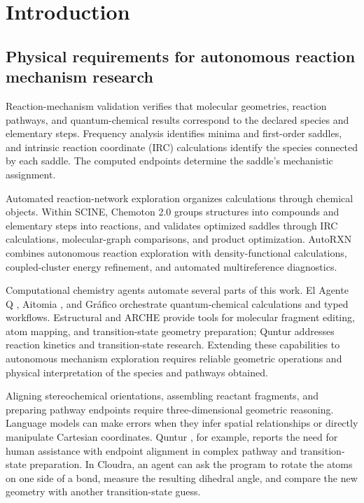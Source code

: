 \section{Introduction}

\subsection{Physical requirements for autonomous reaction mechanism research}

Reaction-mechanism validation verifies that molecular geometries, reaction pathways, and quantum-chemical results correspond to the declared species and elementary steps. Frequency analysis identifies minima and first-order saddles, and intrinsic reaction coordinate (IRC) calculations identify the species connected by each saddle. The computed endpoints determine the saddle's mechanistic assignment.\citep{ref09,ref10}

Automated reaction-network exploration organizes calculations through chemical objects. Within SCINE, Chemoton 2.0 groups structures into compounds and elementary steps into reactions, and validates optimized saddles through IRC calculations, molecular-graph comparisons, and product optimization.\citep{chemoton2022} AutoRXN combines autonomous reaction exploration with density-functional calculations, coupled-cluster energy refinement, and automated multireference diagnostics.\citep{autorxn2023}

Computational chemistry agents automate several parts of this work. El Agente Q \citep{ref01}, Aitomia \citep{ref02}, and Gráfico \citep{ref06} orchestrate quantum-chemical calculations and typed workflows. Estructural \citep{ref04} and ARCHE \citep{ref05} provide tools for molecular fragment editing, atom mapping, and transition-state geometry preparation; Quntur \citep{ref03} addresses reaction kinetics and transition-state research. Extending these capabilities to autonomous mechanism exploration requires reliable geometric operations and physical interpretation of the species and pathways obtained.

Aligning stereochemical orientations, assembling reactant fragments, and preparing pathway endpoints require three-dimensional geometric reasoning. Language models can make errors when they infer spatial relationships or directly manipulate Cartesian coordinates. Quntur \citep{ref03}, for example, reports the need for human assistance with endpoint alignment in complex pathway and transition-state preparation. In Cloudra, an agent can ask the program to rotate the atoms on one side of a bond, measure the resulting dihedral angle, and compare the new geometry with another transition-state guess.

